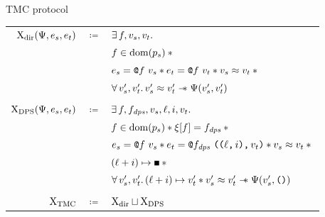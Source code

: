 \begin{frame}{TMC protocol}
\begin{adjustwidth}{-1.5em}{-1.5em}
\begin{tabular}{rcl}
        $\iProt_\mathrm{dir} (\iPredTwo, \datalangExpr_s, \datalangExpr_t)$
        & $\coloneqq$ &
        $\exists \datalangFn, \datalangVal_s, \datalangVal_t \ldotp$
    \\
        &&
        $\datalangFn \in \dom{\datalangProg_s} \iSep {}$
    \\
        &&
        $\datalangExpr_s = \datalangCall{\datalangFnptr{\datalangFn}}{\datalangVal_s} \iSep
        \datalangExpr_t = \datalangCall{\datalangFnptr{\datalangFn}}{\datalangVal_t} \iSep
        \datalangVal_s \iSimilar \datalangVal_t \iSep {}$
    \\
        &&
        $\forall \datalangVal_s', \datalangVal_t' \ldotp
        \datalangVal_s' \iSimilar \datalangVal_t' \iWand
        \iPredTwo (\datalangVal_s', \datalangVal_t')$
    \\\\
        $\iProt_\mathrm{DPS} (\iPredTwo, \datalangExpr_s, \datalangExpr_t)$
        & $\coloneqq$ &
        $\exists \datalangFn, \datalangFn_\mathit{dps}, \datalangVal_s, \datalangLoc, \datalangIdx, \datalangVal_t \ldotp$
    \\
        &&
        $\datalangFn \in \dom{\datalangProg_s} \iSep
        \datalangRenaming [\datalangFn] = \datalangFn_\mathit{dps} \iSep {}$
    \\
        &&
        $\datalangExpr_s = \datalangCall{\datalangFnptr{\datalangFn}}{\datalangVal_s} \iSep
        \datalangExpr_t = \datalangCall{\datalangFnptr{\datalangFn_\mathit{dps}}}{\datalangPair{\datalangPair{\datalangLoc}{\datalangIdx}}{\datalangVal_t}} \iSep
        \datalangVal_s \iSimilar \datalangVal_t \iSep {}$
    \\
        &&
        $(\datalangLoc + \datalangIdx) \iPointsto \datalangHole \iSep {}$
    \\
        &&
        $\forall \datalangVal_s', \datalangVal_t' \ldotp
        (\datalangLoc + \datalangIdx) \iPointsto \datalangVal_t' \iSep
        \datalangVal_s' \iSimilar \datalangVal_t' \iWand
        \iPredTwo (\datalangVal_s', \datalangUnit)$
    \\\\
        $\mathrm{X}_\mathrm{TMC}$
        & $\coloneqq$ &
        $\mathrm{X}_\mathrm{dir} \sqcup \mathrm{X}_\mathrm{DPS}$
\end{tabular}
\end{adjustwidth}
\end{frame}
